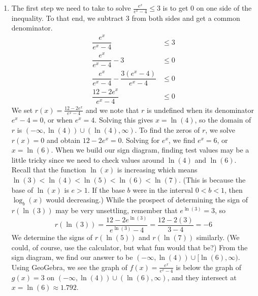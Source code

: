 {\begin{enumerate}
\item The first step we need to take to solve  $\frac{e^{x}}{e^{x}-4} \leq 3$ is to get $0$ on one side of the inequality. To that end, we subtract $3$ from both sides and get a common denominator.
\begin{align*}
\dfrac{e^{x}}{e^{x}-4} & \leq  3  \\[3pt]
\dfrac{e^{x}}{e^{x}-4} - 3 & \leq  0  \\[3pt]
\dfrac{e^{x}}{e^{x}-4} - \dfrac{3 \left(e^{x}-4\right)}{e^{x}-4} & \leq  0  \tag*{Common denomintors.} \\[3pt]
\dfrac{12 - 2e^{x}}{e^{x}-4} & \leq  0 
\end{align*}
We set $r(x) = \frac{12 - 2e^{x}}{e^{x}-4}$ and we note that $r$ is undefined when its denominator $e^{x}-4=0$, or when $e^{x} = 4$.  Solving this gives $x = \ln(4)$, so the domain of $r$ is $(-\infty, \ln(4)) \cup (\ln(4), \infty)$. To find the zeros of $r$, we solve $r(x) = 0$ and obtain $12 - 2e^{x} = 0$.  Solving for $e^{x}$, we find $e^{x} = 6$, or $x = \ln(6)$.  When we build our sign diagram, finding test values may be a little tricky since we need to check values around $\ln(4)$ and $\ln(6)$.  Recall that the function $\ln(x)$ is increasing  which means $\ln(3) < \ln(4) < \ln(5) < \ln(6) < \ln(7)$. (This is because the base of $\ln(x)$ is $e > 1$.  If the base $b$ were in the interval $0 < b < 1$, then $\log_{b}(x)$ would decreasing.) While the prospect of determining the sign of $r\left(\ln(3)\right)$ may be very unsettling, remember that $e^{\ln(3)} = 3$, so 
\[
r\left(\ln(3)\right) = \frac{12 - 2e^{\ln(3)}}{e^{\ln(3)}-4} = \frac{12-2(3)}{3-4} = -6
\]  
We determine the signs of $r\left(\ln(5)\right)$ and $r\left(\ln(7)\right)$ similarly. (We could, of course, use the calculator, but what fun would that be?) From the sign diagram, we find our answer to be $(-\infty,\ln(4)) \cup [\ln(6), \infty)$.  Using GeoGebra, we see the graph of $f(x) = \frac{e^{x}}{e^{x}-4}$ is below the graph of $g(x) = 3$ on $(-\infty,\ln(4)) \cup (\ln(6), \infty)$, and they intersect at $x = \ln(6) \approx 1.792$.


\end{enumerate}}
